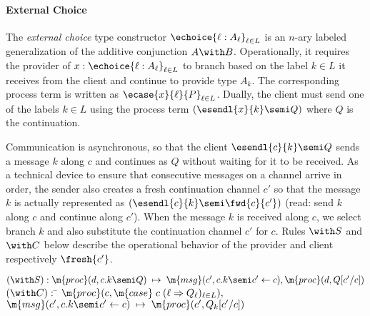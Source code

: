 \paragraph{\textbf{External Choice}}
The \emph{external choice} type constructor
$\echoice{\ell : A_{\ell}}_{\ell \in L}$ is an $n$-ary labeled
generalization of the additive conjunction $A \with B$. Operationally,
it requires the provider of
$x : \echoice{\ell : A_{\ell}}_{\ell \in L}$ to branch based on the
label $k \in L$ it receives from the client and continue to provide
type $A_{k}$. The corresponding process term is written as
$\ecase{x}{\ell}{P}_{\ell \in L}$.  Dually, the client must send one
of the labels $k \in L$ using the process term
$(\esendl{x}{k} \semi Q)$ where $Q$ is the continuation.
Communication is asynchronous, so that the client
$\esendl{c}{k} \semi Q$ sends a message $k$ along $c$ and continues as $Q$
without waiting for it to be received. As a technical device to ensure that
consecutive messages on a channel arrive in order, the sender also creates a
fresh continuation channel $c'$ so that the message $k$ is actually represented
as $(\esendl{c}{k} \semi \fwd{c}{c'})$ (read: send $k$ along $c$ and continue along
$c'$). When the message $k$ is received along $c$, we select branch $k$ and
also substitute the continuation channel $c'$ for $c$.
Rules ${\with}S$ and ${\with}C$ below describe the operational behavior of the
provider and client respectively $\fresh{c'}$.

\begin{tabbing}
$({\with}S) : \m{proc}(d, c.k \semi Q) \;\mapsto\; \m{msg}(c', c.k \semi c' \leftarrow c),
\m{proc}(d, Q[c'/c])$ \\
$({\with}C):$ \= $\m{proc}(c, \m{case}\;c\;(\ell \Rightarrow Q_\ell)_{\ell \in L}),$\\
\> $\m{msg}(c', c.k \semi c' \leftarrow c)
\;\mapsto\; \m{proc}(c', Q_k[c'/c])$
\end{tabbing}

